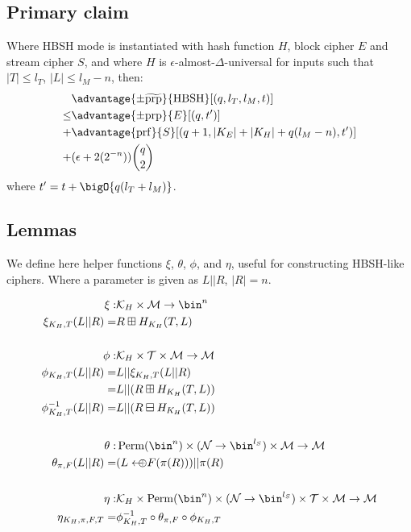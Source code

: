\documentclass[eprint.tex]{subfiles}
\begin{document}
\subsection{Primary claim}
\begin{theorem}\label{hbshadvantage}
    Where HBSH mode is instantiated with hash function $H$, block cipher $E$ and stream cipher $S$,
    and where $H$ is $\epsilon$-almost-$\Delta$-universal for inputs such that
    $|T| \leq l_T$, $|L| \leq l_M - n$, then:
    \begin{align*}
        &\advantage{\pm \widetilde{\mathrm{prp}}}{\HBSH}[(q, l_T, l_M, t)] \\
        \leq& \advantage{\pm \mathrm{prp}}{E}[(q, t')] \\
        +& \advantage{\mathrm{prf}}{S}[(q + 1, |K_E| + |K_H| + q(l_M - n), t')] \\
        +& (\epsilon + 2(2^{-n}))\binom{q}{2} \\
    \end{align*}
    where $t' = t + \bigO{q(l_T + l_M)}$.
\end{theorem}

\subsection{Lemmas}
We define here
helper functions $\xi$, $\theta$, $\phi$, and $\eta$, useful for constructing
HBSH-like ciphers. Where a parameter is given as
$L || R$, $|R|=n$.

\begin{align*}
    \xi :& \mathcal{K}_H \times \mathcal{M} \rightarrow \bin^n \\
    \xi_{K_H, T}(L||R) =& R \boxplus H_{K_H}(T, L) \\
    \vphantom{|} \\
    \phi :& \mathcal{K}_H \times \mathcal{T} \times \mathcal{M} \rightarrow \mathcal{M} \\
    \phi_{K_H, T}(L || R) =& L || \xi_{K_H, T}(L||R) \\
    =& L || (R \boxplus H_{K_H}(T, L)) \\
    \phi^{-1}_{K_H, T}(L || R) =& L || (R \boxminus H_{K_H}(T, L)) \\
    \vphantom{|} \\
    \theta :& \Perm(\bin^n) \times (\mathcal{N} \rightarrow \bin^{l_S}) \times \mathcal{M} \rightarrow \mathcal{M} \\
    \theta_{\pi, F}(L || R) =& (L \arrowoplus F(\pi(R))) || \pi(R) \\
    \vphantom{|} \\
    \eta :& \mathcal{K}_H \times \Perm(\bin^n) \times (\mathcal{N} \rightarrow \bin^{l_S}) \times \mathcal{T} \times \mathcal{M} \rightarrow \mathcal{M} \\
    \eta_{K_H, \pi, F, T} =& \phi_{K_H,T}^{-1} \circ \theta_{\pi, F} \circ \phi_{K_H,T} \\
\end{align*}
\end{document}

